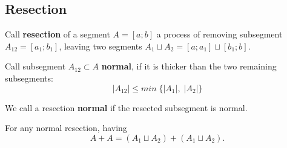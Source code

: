 \subsection{Resection}

\begin{definition}
	Call \textbf{resection} of a segment $A = [a; b]$
	a process of removing subsegment $A_{12} = [a_1; b_1]$,
	leaving two segments $A_1 \sqcup A_2 = [a; a_1] \sqcup [b_1; b]$.
\end{definition}


\begin{definition}
	Call subsegment $A_{12} \subset A$ \textbf{normal}, if it is thicker than the two remaining subsegments:
	\begin{equation}
		\label{normal_resection}
		|A_{12}| \leqslant min\;\{|A_1|,\; |A_2|\}
	\end{equation}
\end{definition}

We call a resection \textbf{normal} if the resected subsegment is normal.

\begin{proposition}
	For any normal resection, having
	\begin{equation}
		\label{sum_is_present}
		A + A = (A_1 \sqcup A_2) + (A_1 \sqcup A_2).
	\end{equation}
\end{proposition}


